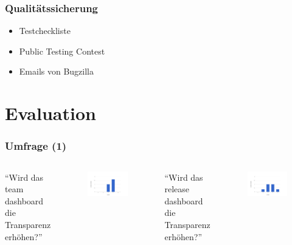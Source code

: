 \documentclass{beamer}
\begin{document}
\begin{frame}
\frametitle{Qualit\"atssicherung}
\begin{itemize}
 \item Testcheckliste
 \item Public Testing Contest
 \item Emails von Bugzilla
\end{itemize}
\end{frame}

\section{Evaluation}

\begin{frame}
\frametitle{Umfrage (1)}
\begin{columns}
   ``Wird das team dashboard die Transparenz erh\"ohen?''
   \begin{figure}[h!]
    \centering
    \includegraphics[scale=0.3,keepaspectratio=true]{./halo2a.png}
   \end{figure}
   ``Wird das release dashboard die Transparenz erh\"ohen?''
   \begin{figure}[h!]
    \centering
    \includegraphics[scale=0.3,keepaspectratio=true]{./halo2d.png}
   \end{figure}
\end{columns}
\end{frame}
\end{document}
